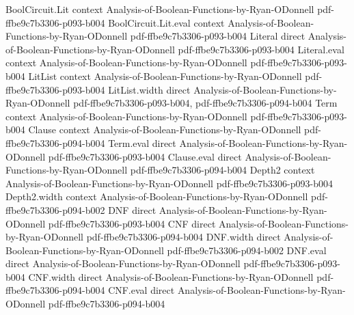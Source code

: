 \begin{theorem}
\label{DecisionTree.degree_le_dtDepth}
\leanok
{}
\proofstep
  {BoolCircuit.Lit}
  {context}
  {Analysis-of-Boolean-Functions-by-Ryan-ODonnell}
  {pdf-ffbe9c7b3306-p093-b004}
\proofstep
  {BoolCircuit.Lit.eval}
  {context}
  {Analysis-of-Boolean-Functions-by-Ryan-ODonnell}
  {pdf-ffbe9c7b3306-p093-b004}
\proofstep
  {Literal}
  {direct}
  {Analysis-of-Boolean-Functions-by-Ryan-ODonnell}
  {pdf-ffbe9c7b3306-p093-b004}
\proofstep
  {Literal.eval}
  {context}
  {Analysis-of-Boolean-Functions-by-Ryan-ODonnell}
  {pdf-ffbe9c7b3306-p093-b004}
\proofstep
  {LitList}
  {context}
  {Analysis-of-Boolean-Functions-by-Ryan-ODonnell}
  {pdf-ffbe9c7b3306-p093-b004}
\proofstep
  {LitList.width}
  {direct}
  {Analysis-of-Boolean-Functions-by-Ryan-ODonnell}
  {pdf-ffbe9c7b3306-p093-b004,
    pdf-ffbe9c7b3306-p094-b004}
\proofstep
  {Term}
  {context}
  {Analysis-of-Boolean-Functions-by-Ryan-ODonnell}
  {pdf-ffbe9c7b3306-p093-b004}
\proofstep
  {Clause}
  {context}
  {Analysis-of-Boolean-Functions-by-Ryan-ODonnell}
  {pdf-ffbe9c7b3306-p094-b004}
\proofstep
  {Term.eval}
  {direct}
  {Analysis-of-Boolean-Functions-by-Ryan-ODonnell}
  {pdf-ffbe9c7b3306-p093-b004}
\proofstep
  {Clause.eval}
  {direct}
  {Analysis-of-Boolean-Functions-by-Ryan-ODonnell}
  {pdf-ffbe9c7b3306-p094-b004}
\proofstep
  {Depth2}
  {context}
  {Analysis-of-Boolean-Functions-by-Ryan-ODonnell}
  {pdf-ffbe9c7b3306-p093-b004}
\proofstep
  {Depth2.width}
  {context}
  {Analysis-of-Boolean-Functions-by-Ryan-ODonnell}
  {pdf-ffbe9c7b3306-p094-b002}
\proofstep
  {DNF}
  {direct}
  {Analysis-of-Boolean-Functions-by-Ryan-ODonnell}
  {pdf-ffbe9c7b3306-p093-b004}
\proofstep
  {CNF}
  {direct}
  {Analysis-of-Boolean-Functions-by-Ryan-ODonnell}
  {pdf-ffbe9c7b3306-p094-b004}
\proofstep
  {DNF.width}
  {direct}
  {Analysis-of-Boolean-Functions-by-Ryan-ODonnell}
  {pdf-ffbe9c7b3306-p094-b002}
\proofstep
  {DNF.eval}
  {direct}
  {Analysis-of-Boolean-Functions-by-Ryan-ODonnell}
  {pdf-ffbe9c7b3306-p093-b004}
\proofstep
  {CNF.width}
  {direct}
  {Analysis-of-Boolean-Functions-by-Ryan-ODonnell}
  {pdf-ffbe9c7b3306-p094-b004}
\proofstep
  {CNF.eval}
  {direct}
  {Analysis-of-Boolean-Functions-by-Ryan-ODonnell}
  {pdf-ffbe9c7b3306-p094-b004}

\end{theorem}
